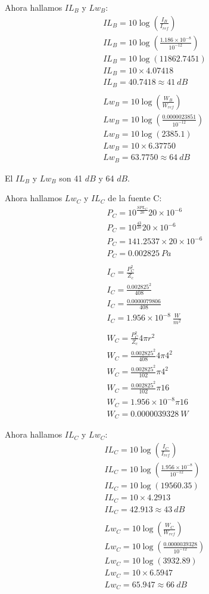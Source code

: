 \documentclass{article}
\begin{document}
Ahora hallamos $IL_B$ y $Lw_B$:
\begin{gather*}
    IL_B = 10 \log(\frac{I_B}{I_{ref}})\\
    IL_B = 10 \log(\frac{1.186 \times 10^{-8}}{10^{-12}})\\
    IL_B = 10 \log(11862.7451)\\
    IL_B = 10 \times 4.07418\\
    IL_B = 40.7418 \approx 41\ dB\\\\
    Lw_B = 10 \log(\frac{W_B}{W_{ref}})\\
    Lw_B = 10 \log(\frac{0.0000023851}{10^{-12}})\\
    Lw_B = 10 \log(2385.1)\\
    Lw_B = 10 \times 6.37750\\
    Lw_B = 63.7750 \approx 64\ dB
\end{gather*}

El $IL_B$ y $Lw_B$ son 41 $dB$ y 64 $dB$.

Ahora hallamos $Lw_C$ y $IL_C$ de la fuente C:
\begin{gather*}
    P_C = 10^{\frac{SPL_C}{20}} 20 \times 10^{-6}\\
    P_C = 10^{\frac{43}{20}} 20 \times 10^{-6}\\
    P_C = 141.2537 \times 20 \times 10^{-6}\\
    P_C = 0.002825\ Pa\\\\
    I_C = \frac{P_C^2}{Z_c}\\
    I_C = \frac{0.002825^2}{408}\\
    I_C = \frac{0.0000079806}{408}\\
    I_C = 1.956 \times 10^{-8}\ \frac{W}{m^2}\\\\
    W_C = \frac{P_C^2}{Z_c} 4\pi r^2\\
    W_C = \frac{0.002825^2}{408} 4\pi 4^2\\
    W_C = \frac{0.002825^2}{102} \pi 4^2\\
    W_C = \frac{0.002825^2}{102} \pi 16\\
    W_C = 1.956 \times 10^{-8} \pi 16\\
    W_C = 0.0000039328\ W
\end{gather*}

Ahora hallamos $IL_C$ y $Lw_C$:
\begin{gather*}
    IL_C = 10 \log(\frac{I_C}{I_{ref}})\\
    IL_C = 10 \log(\frac{1.956 \times 10^{-8}}{10^{-12}})\\
    IL_C = 10 \log(19560.35)\\
    IL_C = 10 \times 4.2913\\
    IL_C = 42.913 \approx 43\ dB\\\\
    Lw_C = 10 \log(\frac{W_C}{W_{ref}})\\
    Lw_C = 10 \log(\frac{0.0000039328}{10^{-12}})\\
    Lw_C = 10 \log(3932.89)\\
    Lw_C = 10 \times 6.5947\\
    Lw_C = 65.947 \approx 66\ dB
\end{gather*}
\end{document}
